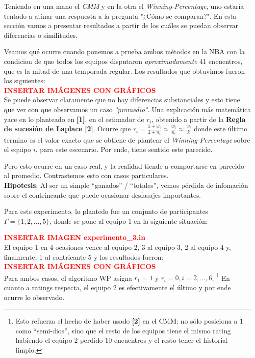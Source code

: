 Teniendo en una mano el \textit{CMM} y en la otra el \textit{Winning-Percentage}, uno estar\'ia tentado a atinar una respuesta a la pregunta "¿C\'omo se comparan?". En esta secci\'on vamos a presentar resultados a partir de los cu\'ales se puedan observar diferencias o similitudes.

Veamos qu\'e ocurre cuando ponemos a prueba ambos m\'etodos en la NBA con la condicion de que todos los equipos disputaron \textit{aproximadamente} 41 encuentros, que es la mitad de una temporada regular. Los resultados que obtuvimos fueron los siguientes: \\

\textcolor{red}{\textbf{INSERTAR IM\'AGENES CON GR\'AFICOS}} \\

Se puede observar claramente que no hay diferencias substanciales y esto tiene que ver con que observamos un caso \textit{"promedio"}. Una explicaci\'on m\'as matem\'atica yace en lo planteado en \textbf{[1]}, en el estimador de $r_{i}$, obtenido a partir de la \textbf{Regla de sucesi\'on de Laplace [2]}. Ocurre que $r_{i} = \frac{1 + w_{i}}{2 + n_{i}} \approx \frac{w_{i}}{n_{i}} \approx \frac{w_{i}}{k}$ donde este \'ultimo termino es el valor exacto que se obtiene de plantear el \textit{Winning-Percentage} sobre el equipo $i$, para este escenario. Por ende, tiene sentido este parecido.

Pero esto ocurre en un caso real, y la realidad tiende a comportarse en parecido al promedio. Contrastemos esto con casos particulares. \\

\textbf{Hipotesis}: Al ser un simple ``ganados'' / ``totales'', vemos p\'erdida de infomaci\'on sobre el contrincante que puede ocasionar desfasajes importantes.

Para este experimento, lo plantedo fue un conjunto de participantes $\Gamma = \{1,2,...,5\}$, donde se pone al equipo $1$ en la siguiente situaci\'on:

\textcolor{red}{\textbf{INSERTAR IMAGEN experimento_3.in}} \\

El equipo $1$ en 4 ocasiones vence al equipo $2$, 3 al equipo $3$, 2 al equipo $4$ y, finalmente, 1 al contricante $5$ y los resultados fueron: \\

\textcolor{red}{\textbf{INSERTAR IM\'AGENES CON GR\'AFICOS}} \\

Para ambos casos, el algoritmo WP asigna $r_1 = 1$ y $r_i = 0, i = 2, ..., 6$. \footnote{Esto refuerza el hecho de haber usado \textbf{[2]} en el CMM: no s\'olo posiciona a $1$ como ``semi-dios'', sino que el resto de los equipos tiene el mismo rating habiendo el equipo $2$ perdido 10 encuentros y el resto tener el historial limpio.} En cuanto a ratings respecta, el equipo $2$ es efectivamente el \'ultimo y por ende ocurre lo observado. \\

